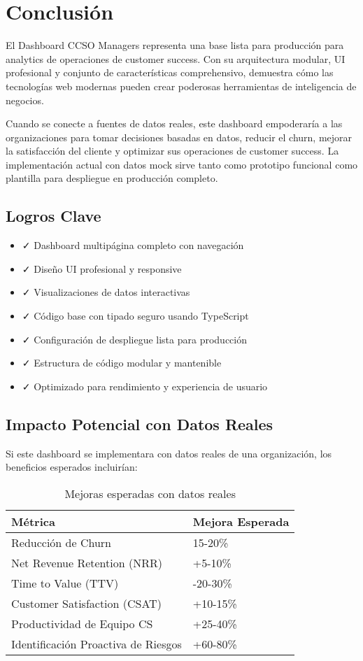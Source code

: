 \documentclass[12pt,a4paper]{article}
\begin{document}
\section{Conclusión}

El Dashboard CCSO Managers representa una base lista para producción para analytics de operaciones de customer success. Con su arquitectura modular, UI profesional y conjunto de características comprehensivo, demuestra cómo las tecnologías web modernas pueden crear poderosas herramientas de inteligencia de negocios.

Cuando se conecte a fuentes de datos reales, este dashboard empoderaría a las organizaciones para tomar decisiones basadas en datos, reducir el churn, mejorar la satisfacción del cliente y optimizar sus operaciones de customer success. La implementación actual con datos mock sirve tanto como prototipo funcional como plantilla para despliegue en producción completo.

\subsection{Logros Clave}

\begin{itemize}
    \item ✓ Dashboard multipágina completo con navegación
    \item ✓ Diseño UI profesional y responsive
    \item ✓ Visualizaciones de datos interactivas
    \item ✓ Código base con tipado seguro usando TypeScript
    \item ✓ Configuración de despliegue lista para producción
    \item ✓ Estructura de código modular y mantenible
    \item ✓ Optimizado para rendimiento y experiencia de usuario
\end{itemize}

\subsection{Impacto Potencial con Datos Reales}

Si este dashboard se implementara con datos reales de una organización, los beneficios esperados incluirían:

\begin{table}[h]
\centering
\begin{tabular}{|l|l|}
\hline
\textbf{Métrica} & \textbf{Mejora Esperada} \\
\hline
Reducción de Churn & 15-20\% \\
Net Revenue Retention (NRR) & +5-10\% \\
Time to Value (TTV) & -20-30\% \\
Customer Satisfaction (CSAT) & +10-15\% \\
Productividad de Equipo CS & +25-40\% \\
Identificación Proactiva de Riesgos & +60-80\% \\
\hline
\end{tabular}
\caption{Mejoras esperadas con datos reales}
\end{table}
\end{document}
